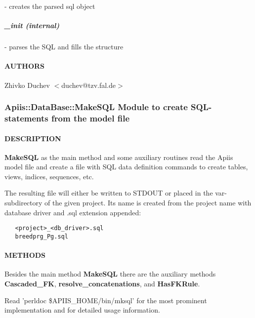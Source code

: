 - creates the parsed sql object

\subparagraph*{\_init (internal)\label{Statement__init_internal_}}


- parses the SQL and fills the structure

\paragraph*{AUTHORS\label{Statement_AUTHORS}}


Zhivko Duchev $<$duchev@tzv.fal.de$>$

\subsubsection{Apiis::DataBase::MakeSQL Module to create SQL-statements from the model file\label{Apiis::DataBase::MakeSQL_Module_to_create_SQL-statements_from_the_model_file}}




\paragraph*{DESCRIPTION\label{Apiis::DataBase::MakeSQL_Module_to_create_SQL-statements_from_the_model_file_DESCRIPTION}}


\textbf{MakeSQL} as the main method and some auxiliary routines read the Apiis model
file and create a file with SQL data definition commands to create tables,
views, indices, sequences, etc.



The resulting file will either be written to STDOUT or placed in the
var-subdirectory of the given project. Its name is created from the project
name with database driver and .sql extension appended:

\begin{verbatim}
   <project>_<db_driver>.sql
   breedprg_Pg.sql
\end{verbatim}
\paragraph*{METHODS\label{Apiis::DataBase::MakeSQL_Module_to_create_SQL-statements_from_the_model_file_METHODS}}


Besides the main method \textbf{MakeSQL} there are the auxiliary methods
\textbf{Cascaded\_FK}, \textbf{resolve\_concatenations}, and \textbf{HasFKRule}.



Read 'perldoc \$APIIS\_HOME/bin/mksql' for the most prominent implementation and
for detailed usage information.

